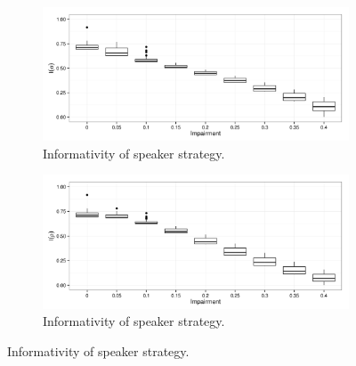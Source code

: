 \begin{figure}
        \begin{subfigure}{0.45\textwidth}
                \includegraphics[width=\textwidth]{plots/Speaker-informativity-20140121-141158}
                \caption{Informativity of speaker strategy.}
        \end{subfigure}
        \begin{subfigure}{0.45\textwidth}
                \includegraphics[width=\textwidth]{plots/Hearer-informativity-20140121-141158}
                \caption{Informativity of speaker strategy.}
        \end{subfigure}


\end{figure}
